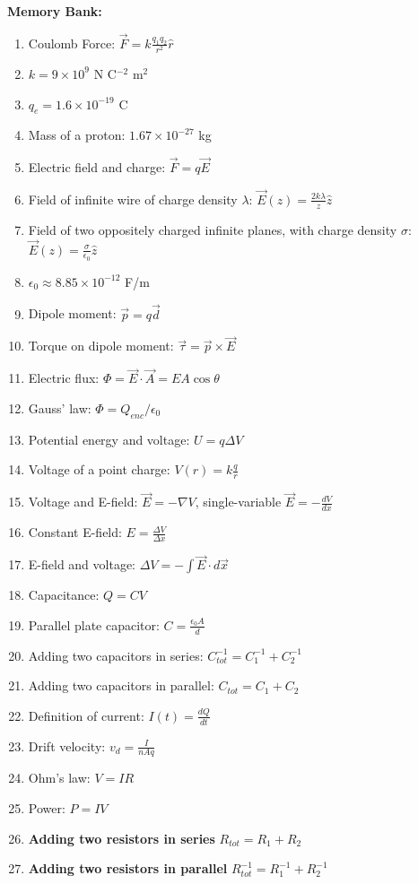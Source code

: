 \documentclass[10pt]{article}
\begin{document}
\maketitle

\textbf{Memory Bank:}
\begin{enumerate}
\item Coulomb Force: $\vec{F} = k \frac{q_1 q_2}{r^2}\hat{r}$
\item $k = 9 \times 10^{9}$ N C$^{-2}$ m$^{2}$
\item $q_e = 1.6 \times 10^{-19}$ C
\item Mass of a proton: $1.67 \times 10^{-27}$ kg
\item Electric field and charge: $\vec{F} = q \vec{E}$
\item Field of infinite wire of charge density $\lambda$: $\vec{E}(z) = \frac{2k\lambda}{z}\hat{z}$
\item Field of two oppositely charged infinite planes, with charge density $\sigma$: $\vec{E}(z) = \frac{\sigma}{\epsilon_0}\hat{z}$
\item $\epsilon_0 \approx 8.85 \times 10^{-12}$ F/m
\item Dipole moment: $\vec{p} = q \vec{d}$
\item Torque on dipole moment: $\vec{\tau} = \vec{p} \times \vec{E}$
\item Electric flux: $\Phi = \vec{E} \cdot \vec{A} = EA \cos\theta$
\item Gauss' law: $\Phi = Q_{enc}/\epsilon_0$
\item Potential energy and voltage: $U = q\Delta V$
\item Voltage of a point charge: $V(r) = k\frac{q}{r}$
\item Voltage and E-field: $\vec{E} = -\nabla V$, single-variable $\vec{E} = -\frac{dV}{dx}$
\item Constant E-field: $E = \frac{\Delta V}{\Delta x}$
\item E-field and voltage: $\Delta V = -\int \vec{E} \cdot d\vec{x}$
\item Capacitance: $Q = CV$
\item Parallel plate capacitor: $C = \frac{\epsilon_0 A}{d}$
\item Adding two capacitors in series: $C_{tot}^{-1} = C_1^{-1} + C_2^{-1}$
\item Adding two capacitors in parallel: $C_{tot} = C_1 + C_2$
\item Definition of current: $I(t) = \frac{dQ}{dt}$
\item Drift velocity: $v_d = \frac{I}{nAq}$
\item Ohm's law: $V = IR$
\item Power: $P = IV$
\item \textbf{Adding two resistors in series} $R_{tot} = R_1 + R_2$
\item \textbf{Adding two resistors in parallel} $R_{tot}^{-1} = R_1^{-1} + R_2^{-1}$
\end{enumerate}
\end{document}
